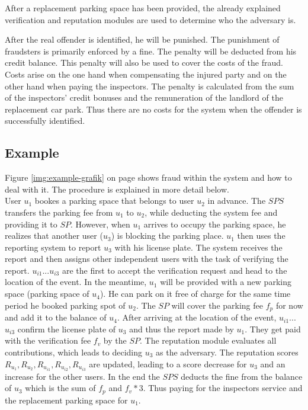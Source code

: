 After a replacement parking space has been provided, the already explained verification and reputation modules are used to determine who the adversary is.

After the real offender is identified, he will be punished. The punishment of fraudsters is primarily enforced by a fine. The penalty will be deducted from his credit balance. This penalty will also be used to cover the costs of the fraud. Costs arise on the one hand when compensating the injured party and on the other hand when paying the inspectors. The penalty is calculated from the sum of the inspectors' credit bonuses and the remuneration of the landlord of the replacement car park. Thus there are no costs for the system when the offender is successfully identified.

\subsection{Example}
Figure \ref{img:example-grafik} on page \pageref{img:example-grafik} shows fraud within the system and how to deal with it. The procedure is explained in more detail below.\\

User $u_1$ bookes a parking space that belongs to user $u_2$ in advance. The $SPS$ transfers the parking fee from $u_1$ to $u_2$, while deducting the system fee and providing it to $SP$. However, when $u_1$ arrives to occupy the parking space, he realizes that another user ($u_3$) is blocking the parking place. $u_1$ then uses the reporting system to report $u_3$ with his license plate. The system receives the report and then assigns other independent users with the task of verifying the report. $u_{i1}$...$u_{i3}$ are the first to accept the verification request and head to the location of the event. In the meantime, $u_1$ will be provided with a new parking space (parking space of $u_4$). He can park on it free of charge for the same time period he booked parking spot of $u_2$. The $SP$ will cover the parking fee $f_p$ for now and add it to the balance of $u_4$. After arriving at the location of the event, $u_{i1}$...$u_{i3}$ confirm the license plate of $u_3$ and thus the report made by $u_1$. They get paid with the verification fee $f_v$ by the $SP$. The reputation module evaluates all contributions, which leads to deciding $u_3$ as the adversary. The reputation scores $R_{u_1}, R_{u_2}, R_{u_{i1}}, R_{u_{i2}}, R_{u_{i3}}$ are updated, leading to a score decrease for $u_3$ and an increase for the other users. In the end the $SPS$ deducts the fine from the balance of $u_3$ which is the sum of $f_p$ and $f_v * 3$. Thus paying for the inspectors service and the replacement parking space for $u_1$. \\

